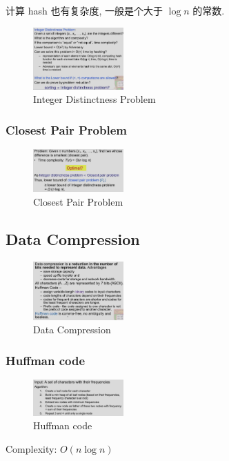 计算 hash 也有复杂度, 一般是个大于 $\log n$ 的常数.

\begin{figure}[H]
    \centering
    \includegraphics[width=0.309\textwidth]{pic/DAA6//Integer Distinctness Problem}
    \caption{Integer Distinctness Problem}
\end{figure}


\subsubsection{Closest Pair Problem}

\begin{figure}[H]
    \centering
    \includegraphics[width=0.309\textwidth]{pic/DAA6/Closest Pair Problem}
    \caption{Closest Pair Problem}
\end{figure}

\subsection{Data Compression}

\begin{figure}[H]
    \centering
    \includegraphics[width=0.309\textwidth]{pic/DAA6/Data Compression}
    \caption{Data Compression}
\end{figure}

\subsubsection{Huffman code}
\begin{figure}[H]
    \centering
    \includegraphics[width=0.309\textwidth]{pic/DAA6/Huffman code}
    \caption{Huffman code}
\end{figure}
Complexity: $O(n\log n)$

